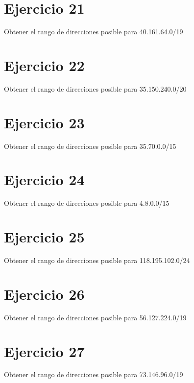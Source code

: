 \documentclass[letterpaper,10pt,spanish]{sphinxmanual}
\begin{document}
\section{Ejercicio 21}
\label{\detokenize{t2_integracion_elementos/ejercicios_subredes_ipv4/rangos_direcciones:ejercicio-21}}
\sphinxAtStartPar
Obtener el rango de direcciones posible para 40.161.64.0/19


\section{Ejercicio 22}
\label{\detokenize{t2_integracion_elementos/ejercicios_subredes_ipv4/rangos_direcciones:ejercicio-22}}
\sphinxAtStartPar
Obtener el rango de direcciones posible para 35.150.240.0/20


\section{Ejercicio 23}
\label{\detokenize{t2_integracion_elementos/ejercicios_subredes_ipv4/rangos_direcciones:ejercicio-23}}
\sphinxAtStartPar
Obtener el rango de direcciones posible para 35.70.0.0/15


\section{Ejercicio 24}
\label{\detokenize{t2_integracion_elementos/ejercicios_subredes_ipv4/rangos_direcciones:ejercicio-24}}
\sphinxAtStartPar
Obtener el rango de direcciones posible para 4.8.0.0/15


\section{Ejercicio 25}
\label{\detokenize{t2_integracion_elementos/ejercicios_subredes_ipv4/rangos_direcciones:ejercicio-25}}
\sphinxAtStartPar
Obtener el rango de direcciones posible para 118.195.102.0/24


\section{Ejercicio 26}
\label{\detokenize{t2_integracion_elementos/ejercicios_subredes_ipv4/rangos_direcciones:ejercicio-26}}
\sphinxAtStartPar
Obtener el rango de direcciones posible para 56.127.224.0/19


\section{Ejercicio 27}
\label{\detokenize{t2_integracion_elementos/ejercicios_subredes_ipv4/rangos_direcciones:ejercicio-27}}
\sphinxAtStartPar
Obtener el rango de direcciones posible para 73.146.96.0/19
\end{document}
